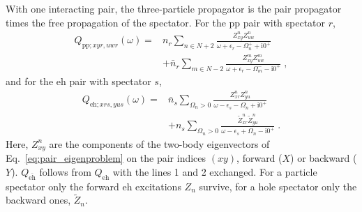 \documentclass[aip,jcp,reprint,noshowkeys,superscriptaddress]{revtex4-1}
\newcommand{\eps}{\epsilon}
\newcommand{\ii}{\mathrm{i}}
\newcommand{\eh}{\text{eh}}
\newcommand{\teh}{\overline{\text{eh}}}
\newcommand{\pp}{\text{pp}}
\begin{document}
With one interacting pair, the three-particle propagator is the pair
propagator times the free propagation of the spectator. For the $\pp$
pair with spectator $r$,
\begin{equation}
\begin{aligned}
Q_{\pp;xyr,uwr}(\omega)
={}&
n_r\sum_{n\in N+2}
\frac{Z^n_{xy}Z^{n}_{uw}}{\omega+\eps_r-\Omega^{+}_n+\ii0^+}
\\
&+
\bar n_r\sum_{m\in N-2}
\frac{Z^m_{xy}Z^{m}_{uw}}{\omega+\eps_r-\Omega^{-}_m-\ii0^+} \;,
\end{aligned}
\label{eq:Q12_full}
\end{equation}
and for the $\eh$ pair with spectator $s$,
\begin{equation}
\begin{aligned}
Q_{\eh;xrs,yus}(\omega)
={}&
\bar n_s\sum_{\Omega_n>0}
\frac{Z^n_{xr}Z^{n}_{yu}}{\omega-\eps_s-\Omega_n+\ii0^+}
\\
&+
n_s\sum_{\Omega_n>0}
\frac{\tilde Z^n_{xr}\tilde Z^{n}_{yu}}{\omega-\eps_s+\Omega_n-\ii0^+} \;.
\end{aligned}
\label{eq:Q31_full}
\end{equation}
Here, $Z^n_{xy}$ are the components of the two-body eigenvectors of
Eq.~\eqref{eq:pair_eigenproblem} on the pair indices $(xy)$, forward ($X$)
or backward ($Y$). $Q_{\teh}$ follows from $Q_{\eh}$ with the lines 1 and 2
exchanged. For a particle spectator only the forward $\eh$ excitations
$Z_n$ survive, for a hole spectator only the backward ones, $\tilde Z_n$.
\end{document}
